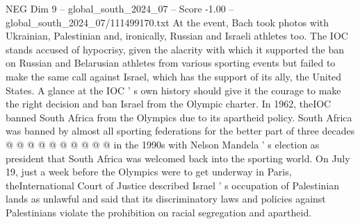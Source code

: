 \begin{textsample}{NEG Dim 9 – global\_south\_2024\_07 – Score -1.00 – global\_south\_2024\_07/111499170.txt}
At the event, Bach took photos with Ukrainian, Palestinian and, ironically, Russian and Israeli athletes too.
The IOC stands accused of hypocrisy, given the alacrity with which it supported the ban on Russian and Belarusian athletes from various sporting events but failed to make the same call against Israel, which has the support of its ally, the United States.
A glance at the IOC ' s own history should give it the courage to make the right decision and ban Israel from the Olympic charter.
In 1962, theIOC banned South Africa from the Olympics due to its apartheid policy.
South Africa was banned by almost all sporting federations for the better part of three decades @ @ @ @ @ @ @ @ @ @ in the 1990s with Nelson Mandela ' s election as president that South Africa was welcomed back into the sporting world.
On July 19, just a week before the Olympics were to get underway in Paris, theInternational Court of Justice described Israel ' s occupation of Palestinian lands as unlawful and said that its discriminatory laws and policies against Palestinians violate the prohibition on racial segregation and apartheid.

\end{textsample}
